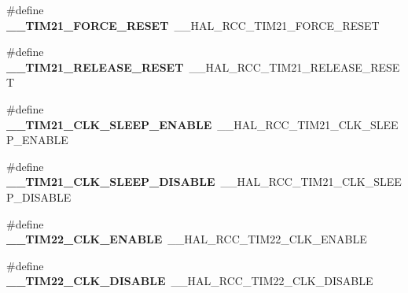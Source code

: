 \begin{DoxyCompactItemize}
\item 
\mbox{\label{group___h_a_l___r_c_c___aliased_ga6d2dbc31d955310a9360e55fe7748065}} 
\#define {\bfseries \+\_\+\+\_\+\+T\+I\+M21\+\_\+\+F\+O\+R\+C\+E\+\_\+\+R\+E\+S\+ET}~\+\_\+\+\_\+\+H\+A\+L\+\_\+\+R\+C\+C\+\_\+\+T\+I\+M21\+\_\+\+F\+O\+R\+C\+E\+\_\+\+R\+E\+S\+ET
\item 
\mbox{\label{group___h_a_l___r_c_c___aliased_ga9058ce5ea35581c862efa9d0be0a991e}} 
\#define {\bfseries \+\_\+\+\_\+\+T\+I\+M21\+\_\+\+R\+E\+L\+E\+A\+S\+E\+\_\+\+R\+E\+S\+ET}~\+\_\+\+\_\+\+H\+A\+L\+\_\+\+R\+C\+C\+\_\+\+T\+I\+M21\+\_\+\+R\+E\+L\+E\+A\+S\+E\+\_\+\+R\+E\+S\+ET
\item 
\mbox{\label{group___h_a_l___r_c_c___aliased_ga92b381109bd6db49c8ad5a607ed3a99b}} 
\#define {\bfseries \+\_\+\+\_\+\+T\+I\+M21\+\_\+\+C\+L\+K\+\_\+\+S\+L\+E\+E\+P\+\_\+\+E\+N\+A\+B\+LE}~\+\_\+\+\_\+\+H\+A\+L\+\_\+\+R\+C\+C\+\_\+\+T\+I\+M21\+\_\+\+C\+L\+K\+\_\+\+S\+L\+E\+E\+P\+\_\+\+E\+N\+A\+B\+LE
\item 
\mbox{\label{group___h_a_l___r_c_c___aliased_ga2079771896a6ffc761933edb8bcaaa11}} 
\#define {\bfseries \+\_\+\+\_\+\+T\+I\+M21\+\_\+\+C\+L\+K\+\_\+\+S\+L\+E\+E\+P\+\_\+\+D\+I\+S\+A\+B\+LE}~\+\_\+\+\_\+\+H\+A\+L\+\_\+\+R\+C\+C\+\_\+\+T\+I\+M21\+\_\+\+C\+L\+K\+\_\+\+S\+L\+E\+E\+P\+\_\+\+D\+I\+S\+A\+B\+LE
\item 
\mbox{\label{group___h_a_l___r_c_c___aliased_ga1cb31ba98237a6cf0ef42a744cb85492}} 
\#define {\bfseries \+\_\+\+\_\+\+T\+I\+M22\+\_\+\+C\+L\+K\+\_\+\+E\+N\+A\+B\+LE}~\+\_\+\+\_\+\+H\+A\+L\+\_\+\+R\+C\+C\+\_\+\+T\+I\+M22\+\_\+\+C\+L\+K\+\_\+\+E\+N\+A\+B\+LE
\item 
\mbox{\label{group___h_a_l___r_c_c___aliased_ga866ebd9a0fc9021e63853457d20b24da}} 
\#define {\bfseries \+\_\+\+\_\+\+T\+I\+M22\+\_\+\+C\+L\+K\+\_\+\+D\+I\+S\+A\+B\+LE}~\+\_\+\+\_\+\+H\+A\+L\+\_\+\+R\+C\+C\+\_\+\+T\+I\+M22\+\_\+\+C\+L\+K\+\_\+\+D\+I\+S\+A\+B\+LE
\item 
\mbox{\label{group___h_a_l___r_c_c___aliased_ga3366750cb7794db4d1d46dd8d968038d}} 

\end{DoxyCompactItemize}
